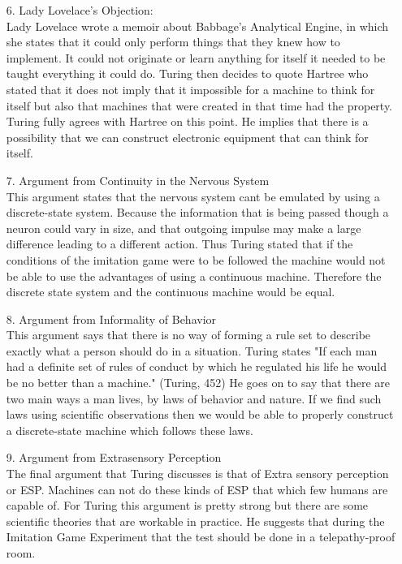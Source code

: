 \documentclass[journal, a4paper]{IEEEtran}
\begin{document}
\begin{itemize}
\item[6.] Lady Lovelace's Objection:
	\\ Lady Lovelace wrote a memoir about Babbage's Analytical Engine, in which she states that it could only perform things that they knew how to implement. It could not originate or learn anything for itself it needed to be taught everything it could do. Turing then decides to quote Hartree who stated that it does not imply that it impossible for a machine to think for itself but also that machines that were created in that time had the property. Turing fully agrees with Hartree on this point. He implies that there is a possibility that we can construct electronic equipment that can think for itself.
\item[7.] Argument from Continuity in the Nervous System
	\\ This argument states that the nervous system cant be emulated by using a discrete-state system. Because the information that is being passed though a neuron could vary in size, and that outgoing impulse may make a large difference leading to a different action. Thus Turing stated that if the conditions of the imitation game were to be followed the machine would not be able to use the advantages of using a continuous machine. Therefore the discrete state system and the continuous machine would be equal.
\item[8.] Argument from Informality of Behavior
	\\ This argument says that there is no way of forming a rule set to describe exactly what a person should do in a situation. Turing states "If each man had a definite set of rules of conduct by which he regulated his life he would be no better than a machine." (Turing, 452) He goes on to say that there are two main ways a man lives, by laws of behavior and nature. If we find such laws using scientific observations then we would be able to properly construct a discrete-state machine which follows these laws.
\item[9.] Argument from Extrasensory Perception
	\\ The final argument that Turing discusses is that of Extra sensory perception or ESP. Machines can not do these kinds of ESP that which few humans are capable of. For Turing this argument is pretty strong but there are some scientific theories that are workable in practice. He suggests that during the Imitation Game Experiment that the test should be done in a telepathy-proof room.
\end{itemize}
\end{document}
